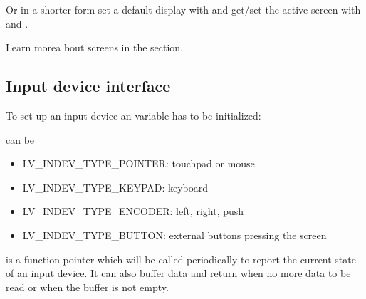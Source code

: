 \documentclass[letterpaper,10pt,english]{sphinxmanual}
\begin{document}
Or in a shorter form set a default display with  and get/set the active screen with  and .

Learn morea bout screens in the  section.


\subsection{Input device interface}
\label{\detokenize{porting/indev::doc}}\label{\detokenize{porting/indev:input-device-interface}}
To set up an input device an  variable has to be initialized:

%
\begin{sphinxVerbatim}[commandchars=\\\{\}]
   
 
 
  
\end{sphinxVerbatim}

 can be
\begin{itemize}
\item {} 
LV\_INDEV\_TYPE\_POINTER: touchpad or mouse

\item {} 
LV\_INDEV\_TYPE\_KEYPAD: keyboard

\item {} 
LV\_INDEV\_TYPE\_ENCODER: left, right, push

\item {} 
LV\_INDEV\_TYPE\_BUTTON: external buttons pressing the screen

\end{itemize}

 is a function pointer which will be called periodically to report the current state of an input device. It can also buffer data and return  when no more data to be read or  when the buffer is not empty.
\end{document}
